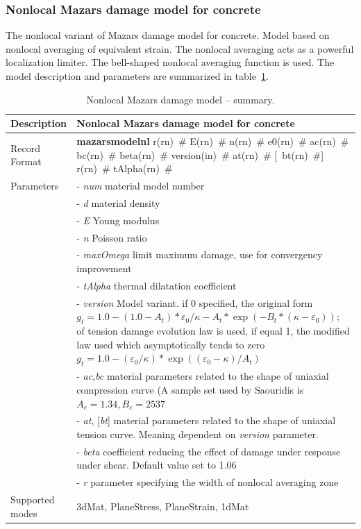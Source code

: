 \documentclass[a4paper]{article}
\newcommand{\descitem}[1]{{\noindent \bf #1}}
\newcommand{\elemparam}[2]{{{#1\tiny (#2)}~\#}}
\newcommand{\optelemparam}[2]{[{~\elemparam{#1}{#2}}]}
\newcommand{\param}[1]{{\it #1}}
\newcommand{\optparam}[1]{[{\it #1}]}
\begin{document}
\subsubsection{Nonlocal Mazars damage model for concrete}
The nonlocal variant of Mazars damage model for concrete.
Model based on nonlocal averaging of equivalent strain.
The nonlocal averaging acts as a powerful localization
limiter. The bell-shaped nonlocal averaging function is used.
The model description and parameters are summarized
in table~\ref{maznl_table}.

\begin{table}[!htb]
\begin{tabular}{|l|p{9cm}|}
\hline
Description & Nonlocal Mazars damage model for concrete\\
\hline
Record Format & \descitem{mazarsmodelnl} \elemparam{r}{rn} \elemparam{E}{rn}
\elemparam{n}{rn}  \elemparam{e0}{rn}
\elemparam{ac}{rn} \elemparam{bc}{rn} \elemparam{beta}{rn}
\elemparam{version}{in} \elemparam{at}{rn} \optelemparam{bt}{rn} \elemparam{r}{rn}
\elemparam{tAlpha}{rn} \\
Parameters &- \param{num} material model number\\
&- \param{d} material density\\
&- \param{E} Young modulus\\
&- \param{n} Poisson ratio\\
&- \param{maxOmega} limit maximum damage, use for convergency improvement\\
&- \param{tAlpha} thermal dilatation coefficient\\
&- \param{version} Model variant. if 0 specified, the original form
$g_t= 1.0-(1.0-A_t)*\varepsilon_0/\kappa - A_t*\exp(-B_t*(\kappa-\varepsilon_0));
$ of
tension damage evolution law is used, if equal 1, the modified law
used which asymptotically tends to zero
$g_t = 1.0-(\varepsilon_0/\kappa)*\exp((\varepsilon_0-\kappa)/A_t)$\\
&- \param{ac},\param{bc} material parameters related to the shape of
uniaxial compression curve (A sample set used by Saouridis is $A_c =
1.34, B_c = 2537$\\
&- \param{at}, \optparam{bt} material parameters related to the shape of
uniaxial tension curve. Meaning dependent on \param{version}
parameter.\\
&- \param{beta} coefficient reducing the effect of damage under
response under shear. Default value set to 1.06\\
&- \param{r} parameter specifying the width of nonlocal averaging zone\\
Supported modes& 3dMat, PlaneStress, PlaneStrain, 1dMat\\
\hline
\end{tabular}
\caption{Nonlocal Mazars damage model  -- summary.}
\label{maznl_table}
\end{table}
\end{document}
